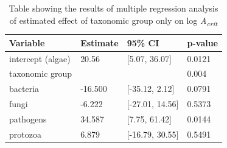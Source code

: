 {{}

\begin{table}[h]
\begin{center}
    \caption{Table showing the results of multiple regression analysis of estimated effect of taxonomic group only on log \textit{A\textsubscript{crit}}}
    \label{crouch}
    \begin{tabular}{  l  p{1.5cm} p{3cm}  p{1.5cm}}
        \toprule
\textbf{Variable} 
&\textbf{Estimate}      
& \textbf{95\% CI}
& \textbf{p-value}   \\\midrule
intercept (algae)
&20.56
& [5.07, 36.07]
& 0.0121 \\\hline
taxonomic group
&
& 
&0.004 \\\hline
bacteria
&-16.500
& [-35.12, 2.12]
&0.0791 \\\hline
fungi
&-6.222 
& [-27.01, 14.56]
& 0.5373 \\\hline
pathogens
&34.587
& [7.75, 61.42]
& 0.0144 \\\hline
protozoa
&6.879 
& [-16.79, 30.55]
& 0.5491  \\
        \bottomrule
    \end{tabular}
    \end{center}
\end{table}








}
